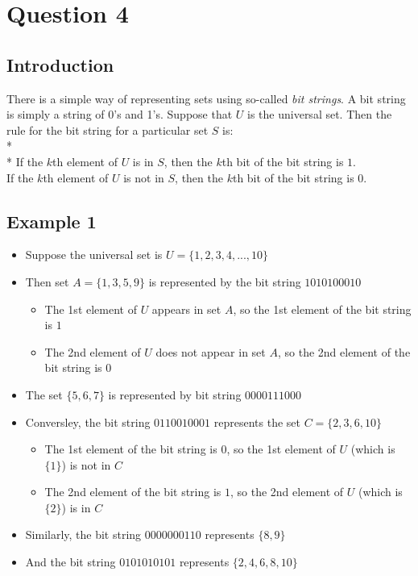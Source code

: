 \documentclass[12pt,a4paper]{article}
\begin{document}
\section{Question 4}

\subsection{Introduction}

There is a simple way of representing sets using so-called \emph{bit strings}. A bit string is simply a string of 0's and 1's. Suppose that $U$ is the universal set. Then the rule for the bit string for a particular set $S$ is:
\\*
\\*
If the $k$th element of $U$ is in $S$, then the $k$th bit of the bit string is $1$. \\
If the $k$th element of $U$ is not in $S$, then the $k$th bit of the bit string is $0$.

\subsection{Example 1}
\begin{itemize}
\item Suppose the universal set is $U = \{1, 2, 3, 4, ..., 10\}$
\item Then set $A = \{1, 3, 5, 9\}$ is represented by the bit string $1010100010$
	\begin{itemize}
	\item The 1st element of $U$ appears in set $A$, so the 1st element of the bit string is $1$
	\item The 2nd element of $U$ does not appear in set $A$, so the 2nd element of the bit string is $0$
	\end{itemize}
\item The set $\{5, 6, 7\}$ is represented by bit string $0000111000$
\item Conversley, the bit string $0110010001$ represents the set $C = \{2, 3, 6, 10\}$
	\begin{itemize}		
	\item The 1st element of the bit string is $0$, so the 1st element of $U$ (which is $\{1\}$) is not in $C$
	\item The 2nd element of the bit string is $1$, so the 2nd element of $U$ (which is $\{2\}$) is in $C$
	\end{itemize}	
\item Similarly, the bit string $0000000110$ represents $\{8, 9\}$
\item And the bit string $0101010101$ represents $\{2, 4, 6, 8, 10\}$
\end{itemize}
\end{document}
